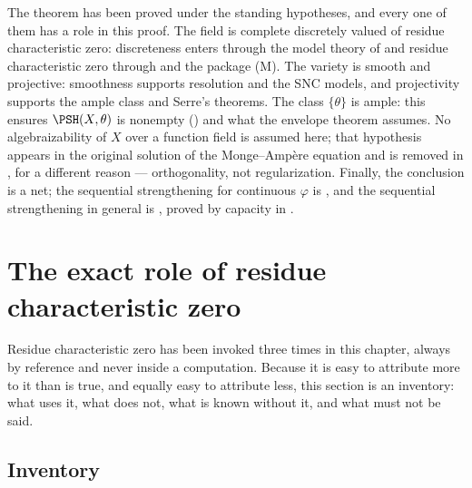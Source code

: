 \begin{remark}
\label{rem:ch22-regularization-hypotheses}
The theorem has been proved under the standing hypotheses, and every one of
them has a role in this proof.  The field is complete discretely valued of
residue
characteristic zero: discreteness enters through the model theory of
 and residue characteristic zero through
 and the package \textup{(M)}.  The variety is smooth
and projective: smoothness supports resolution and the SNC models, and
projectivity supports the ample class and Serre's theorems.  The class
$\{\theta\}$ is ample: this ensures
$\PSH(X,\theta)$ is nonempty () and
what the envelope theorem assumes.  No algebraizability of $X$ over a
function field is assumed here; that hypothesis appears in the original
solution of the Monge--Amp\`ere equation and is removed in
, for a different reason ---
orthogonality, not regularization.  Finally, the conclusion is a net; the
sequential strengthening for continuous $\varphi$ is
, and the sequential
strengthening in general is , proved
by capacity in .
\end{remark}

\section{The exact role of residue characteristic zero}
\label{sec:ch22-char-zero}

Residue characteristic zero has been invoked three times in this chapter,
always by reference and never inside a computation.  Because it is easy to
attribute more to it than is true, and equally easy to attribute less, this
section is an inventory: what uses it, what does not, what is known without
it, and what must not be said.

\subsection{Inventory}

